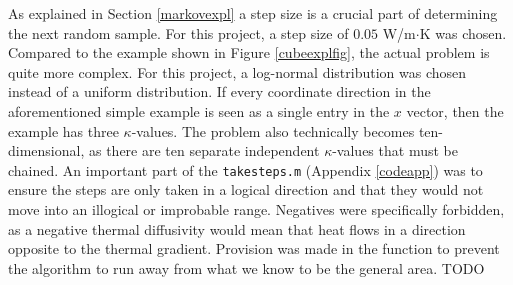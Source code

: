 As explained in Section \ref{markovexpl} a step size is a crucial part of determining the next random sample.
	For this project, a step size of $0.05$ W/m$\cdot$K was chosen.
	Compared to the example shown in Figure \ref{cubeexplfig}, the actual problem is quite more complex. 
	For this project, a log-normal distribution was chosen instead of a uniform distribution.
	If every coordinate direction in the aforementioned simple example is seen as a single entry in the $x$ vector, then the example has three $\kappa$-values.
	The problem also technically becomes ten-dimensional, as there are ten separate independent $\kappa$-values that must be chained.
	An important part of the \texttt{takesteps.m} (Appendix \ref{codeapp}) was to ensure the steps are only taken in a logical direction and that they would not move into an illogical or improbable range.
	Negatives were specifically forbidden, as a negative thermal diffusivity would mean that heat flows in a direction opposite to the thermal gradient.
	Provision was made in the function to prevent the algorithm to run away from what we know to be the general area. 
	TODO
%
%
%
%

	

